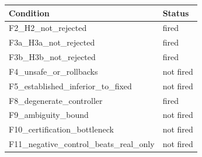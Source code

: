 \begin{tabular}{ll}
\toprule
Condition & Status \\
\midrule
F2\_H2\_not\_rejected & fired \\
F3a\_H3a\_not\_rejected & fired \\
F3b\_H3b\_not\_rejected & fired \\
F4\_unsafe\_or\_rollbacks & not fired \\
F5\_established\_inferior\_to\_fixed & not fired \\
F8\_degenerate\_controller & fired \\
F9\_ambiguity\_bound & not fired \\
F10\_certification\_bottleneck & not fired \\
F11\_negative\_control\_beats\_real\_only & not fired \\
\bottomrule
\end{tabular}
